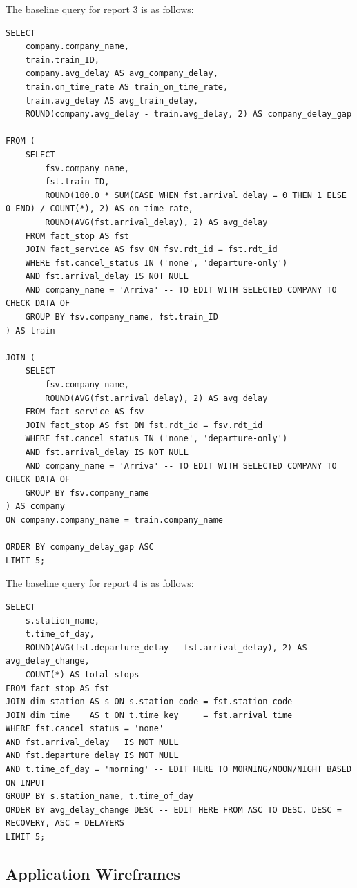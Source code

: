 The baseline query for report 3 is as follows:
\begin{lstlisting}
SELECT
	company.company_name,
	train.train_ID,
	company.avg_delay AS avg_company_delay,
	train.on_time_rate AS train_on_time_rate,
	train.avg_delay AS avg_train_delay,
	ROUND(company.avg_delay - train.avg_delay, 2) AS company_delay_gap

FROM (
	SELECT
		fsv.company_name,
		fst.train_ID,
		ROUND(100.0 * SUM(CASE WHEN fst.arrival_delay = 0 THEN 1 ELSE 0 END) / COUNT(*), 2) AS on_time_rate,
		ROUND(AVG(fst.arrival_delay), 2) AS avg_delay
	FROM fact_stop AS fst 
	JOIN fact_service AS fsv ON fsv.rdt_id = fst.rdt_id
	WHERE fst.cancel_status IN ('none', 'departure-only')
	AND fst.arrival_delay IS NOT NULL
	AND company_name = 'Arriva' -- TO EDIT WITH SELECTED COMPANY TO CHECK DATA OF
	GROUP BY fsv.company_name, fst.train_ID
) AS train

JOIN (
	SELECT
		fsv.company_name,
		ROUND(AVG(fst.arrival_delay), 2) AS avg_delay
	FROM fact_service AS fsv
	JOIN fact_stop AS fst ON fst.rdt_id = fsv.rdt_id
	WHERE fst.cancel_status IN ('none', 'departure-only')
	AND fst.arrival_delay IS NOT NULL
	AND company_name = 'Arriva' -- TO EDIT WITH SELECTED COMPANY TO CHECK DATA OF
	GROUP BY fsv.company_name
) AS company
ON company.company_name = train.company_name

ORDER BY company_delay_gap ASC
LIMIT 5;
\end{lstlisting}


The baseline query for report 4 is as follows:
\begin{lstlisting}
SELECT
	s.station_name,
	t.time_of_day,
	ROUND(AVG(fst.departure_delay - fst.arrival_delay), 2) AS avg_delay_change,
	COUNT(*) AS total_stops
FROM fact_stop AS fst
JOIN dim_station AS s ON s.station_code = fst.station_code
JOIN dim_time    AS t ON t.time_key     = fst.arrival_time
WHERE fst.cancel_status = 'none'
AND fst.arrival_delay   IS NOT NULL
AND fst.departure_delay IS NOT NULL
AND t.time_of_day = 'morning' -- EDIT HERE TO MORNING/NOON/NIGHT BASED ON INPUT
GROUP BY s.station_name, t.time_of_day
ORDER BY avg_delay_change DESC -- EDIT HERE FROM ASC TO DESC. DESC = RECOVERY, ASC = DELAYERS
LIMIT 5;

\end{lstlisting}

\subsection{Application Wireframes}
\label{app:application_wireframes}

